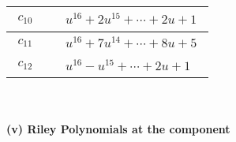 \documentclass[1p]{elsarticle_modified}
\theoremstyle{definition}
\begin{document}
\begin{tabular}{m{50pt}|m{274pt}}
\hline $$\begin{aligned}c_{10}\end{aligned}$$&$\begin{aligned}
&u^{16}+2 u^{15}+\cdots+2 u+1
\end{aligned}$\\
\hline $$\begin{aligned}c_{11}\end{aligned}$$&$\begin{aligned}
&u^{16}+7 u^{14}+\cdots+8 u+5
\end{aligned}$\\
\hline $$\begin{aligned}c_{12}\end{aligned}$$&$\begin{aligned}
&u^{16}- u^{15}+\cdots+2 u+1
\end{aligned}$\\
\hline
\end{tabular}\\~\\
\newpage\renewcommand{\arraystretch}{1}
\flushleft \textbf{(v) Riley Polynomials at the component}\newline \\
\end{document}
